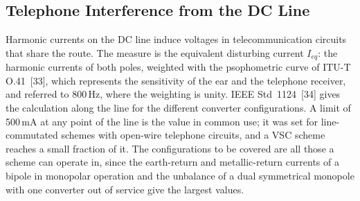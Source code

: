 \subsection{Telephone Interference from the DC Line}
\label{sec:tif}

Harmonic currents on the DC line induce voltages in telecommunication circuits
that share the route. The measure is the equivalent disturbing current
$I_{eq}$: the harmonic currents of both poles, weighted with the psophometric
curve of ITU-T O.41~[33], which represents the sensitivity of the ear and the
telephone receiver, and referred to 800\,Hz, where the weighting is unity.
IEEE Std~1124~[34] gives the calculation along the line for the different
converter configurations. A limit of 500\,mA at any point of the line is the
value in common use; it was set for line-commutated schemes with open-wire
telephone circuits, and a VSC scheme reaches a small fraction of it. The
configurations to be covered are all those a scheme can operate in, since the
earth-return and metallic-return currents of a bipole in monopolar operation
and the unbalance of a dual symmetrical monopole with one converter out of
service give the largest values.
\FloatBarrier

